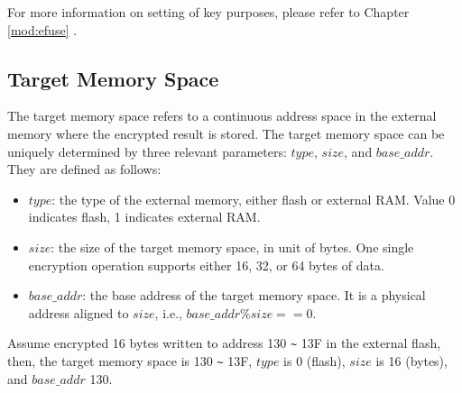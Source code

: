 \documentclass[main\_\_EN.tex]{subfiles}
\begin{document}
For more information on setting of key purposes, please refer to Chapter \ref{mod:efuse} \textit{}.

\subsection{Target Memory Space} \label{object space}
The target memory space refers to a continuous address space in the external memory where the encrypted result is stored. The target memory space can be uniquely determined by three relevant parameters: \begin{math}type\end{math}, \begin{math}size\end{math}, and \begin{math}base\_addr\end{math}. They are defined as follows:

\begin{itemize}
    \item \begin{math}type\end{math}: the type of the external memory, either flash or external RAM. Value 0 indicates flash, 1 indicates external RAM.
    \item \begin{math}size\end{math}: the size of the target memory space, in unit of bytes. One single encryption operation supports either 16, 32, or 64 bytes of data.
    \item \begin{math}base\_addr\end{math}: the base address of the target memory space. It is a physical address aligned to \begin{math}size\end{math}, i.e., \begin{math} base\_addr \% size == 0 \end{math}.
\end{itemize}

Assume encrypted 16 bytes written to address \hexprefix{}130 \verb+~+ \hexprefix{}13F in the external flash, then, the target memory space is \hexprefix{}130 \verb+~+ \hexprefix{}13F, \begin{math}type\end{math} is 0 (flash), \begin{math}size\end{math} is 16 (bytes), and \begin{math}base\_addr\end{math} \hexprefix{}130.
\end{document}
